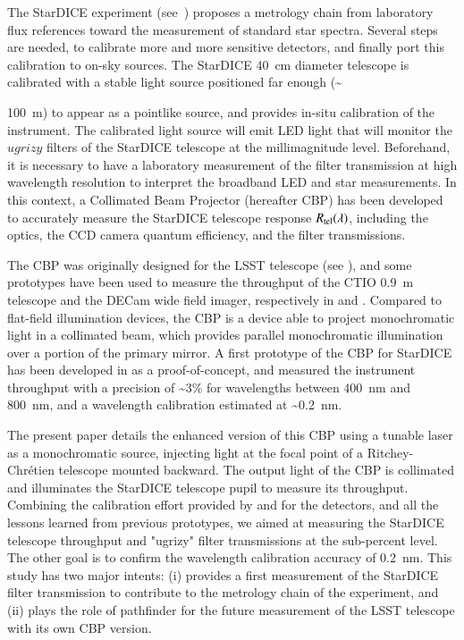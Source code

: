 The StarDICE experiment (see~\cite{Betoule_2023}) proposes a metrology chain from laboratory flux references toward the measurement of standard star spectra. Several steps are needed, to calibrate more and more sensitive detectors, and finally port this calibration to on-sky sources. The StarDICE \SI{40}{\centi\meter} diameter telescope is calibrated with a stable light source positioned far enough (\textasciitilde {\SI{100}{\meter}) to appear as a pointlike source, and provides in-situ calibration of the instrument. The calibrated light source will emit LED light that will monitor the $ugrizy$ filters of the StarDICE telescope at the millimagnitude level. Beforehand, it is necessary to have a laboratory measurement of the filter transmission at high wavelength resolution to interpret the broadband LED and star measurements. In this context, a Collimated Beam Projector (hereafter CBP) has been developed to accurately measure the StarDICE telescope response $R_{\mathrm{tel}}(\lambda)$, including the optics, the CCD camera quantum efficiency, and the filter transmissions. 

The CBP was originally designed for the LSST telescope (see \cite{ingraham2016}), and some prototypes have been used to measure the throughput of the CTIO \SI{0.9}{\meter} telescope and the DECam wide field imager, respectively in \cite{coughlin2018} and \cite{coughlin2016}. Compared to flat-field illumination devices, the CBP is a device able to project monochromatic light in a collimated beam, which provides parallel monochromatic illumination over a portion of the primary mirror. A first prototype of the CBP for StarDICE has been developed in \cite{Mondrik_2023} as a proof-of-concept, and measured the instrument throughput with a precision of \textasciitilde 3\% for wavelengths between \SI{400}{\nano\meter} and \SI{800}{\nano\meter}, and a wavelength calibration estimated at \textasciitilde \SI{0.2}{\nano\meter}. 

The present paper details the enhanced version of this CBP using a tunable laser as a monochromatic source, injecting light at the focal point of a Ritchey-Chrétien telescope mounted backward. The output light of the CBP is collimated and illuminates the StarDICE telescope pupil to measure its throughput. Combining the calibration effort provided by \cite{houston2008detectors} and \cite{solarcell} for the detectors, and all the lessons learned from previous prototypes, we aimed at measuring the StarDICE telescope throughput and "ugrizy" filter transmissions at the sub-percent level. The other goal is to confirm the wavelength calibration accuracy of \SI{0.2}{\nano\meter}. This study has two major intents: (i) provides a first measurement of the StarDICE filter transmission to contribute to the metrology chain of the experiment, and (ii) plays the role of pathfinder for the future measurement of the LSST telescope with its own CBP version.

}
